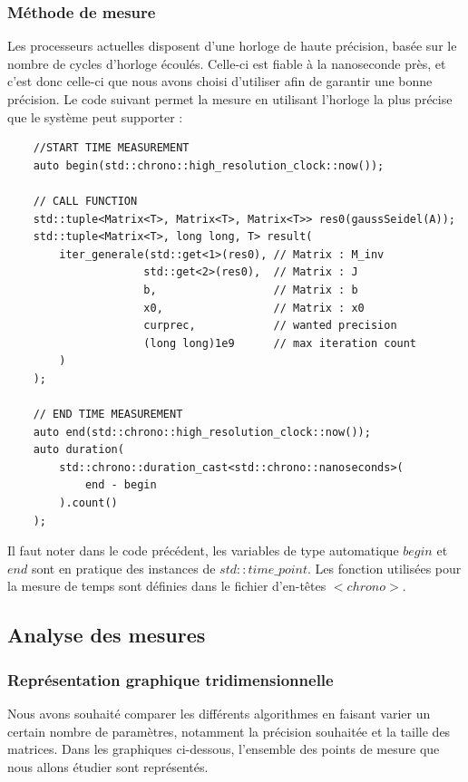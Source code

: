 \subsubsection{Méthode de mesure}
Les processeurs actuelles disposent d'une horloge de haute précision, basée sur le nombre de cycles d'horloge écoulés. Celle-ci est fiable à la nanoseconde près, et c'est donc celle-ci que nous avons choisi d'utiliser afin de garantir une bonne précision. Le code suivant permet la mesure en utilisant l'horloge la plus précise que le système peut supporter :

\begin{verbatim}
	//START TIME MEASUREMENT
	auto begin(std::chrono::high_resolution_clock::now());
	
	// CALL FUNCTION
	std::tuple<Matrix<T>, Matrix<T>, Matrix<T>> res0(gaussSeidel(A));
	std::tuple<Matrix<T>, long long, T> result(
		iter_generale(std::get<1>(res0), // Matrix : M_inv
					 std::get<2>(res0),  // Matrix : J
					 b,                  // Matrix : b
					 x0,                 // Matrix : x0
					 curprec,            // wanted precision
					 (long long)1e9      // max iteration count
		)
	);
	
	// END TIME MEASUREMENT
	auto end(std::chrono::high_resolution_clock::now());
	auto duration(
		std::chrono::duration_cast<std::chrono::nanoseconds>(
			end - begin
		).count()
	);

\end{verbatim}

Il faut noter dans le code précédent, les variables de type automatique $begin$ et $end$ sont en pratique des instances de $std::time\_point$. Les fonction utilisées pour la mesure de temps sont définies dans le fichier d'en-têtes $<chrono>$.\\



\subsection{Analyse des mesures}

\subsubsection{Représentation graphique tridimensionnelle}
Nous avons souhaité comparer les différents algorithmes en faisant varier un certain nombre de paramètres, notamment la précision souhaitée et la taille des matrices. Dans les graphiques ci-dessous, l'ensemble des points de mesure que nous allons étudier sont représentés.



